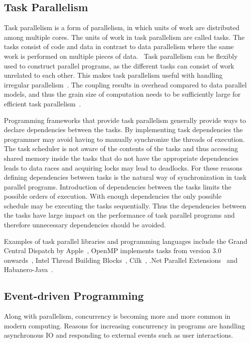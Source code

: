 \subsection{Task Parallelism}
\label{subsec:task-parallelism}
Task parallelism is a form of parallelism, in which units of work are distributed among multiple cores. The units of work in task parallelism are called tasks. The tasks consist of code and data in contrast to data parallelism where the same work is performed on multiple pieces of data.~\cite{hennessy2011computer} Task parallelism can be flexibly used to construct parallel programs, as the different tasks can consist of work unrelated to each other. This makes task parallelism useful with handling irregular parallelism~\cite{ayguade2009design}. The coupling results in overhead compared to data parallel models, and thus the grain size of computation needs to be sufficiently large for efficient task parallelism~\cite{subhlok1993exploiting}.

Programming frameworks that provide task parallelism generally provide ways to declare dependencies between the tasks. By implementing task dependencies the programmer may avoid having to manually synchronize the threads of execution. The task scheduler is not aware of the contents of the tasks and thus accessing shared memory inside the tasks that do not have the appropriate dependencies leads to data races and acquiring locks may lead to deadlocks. For these reasons defining dependencies between tasks is the natural way of synchronization in task parallel programs. Introduction of dependencies between the tasks limits the possible orders of execution. With enough dependencies the only possible schedule may be executing the tasks sequentially. Thus the dependencies between the tasks have large impact on the performance of task parallel programs and therefore unnecessary dependencies should be avoided.~\cite{hennessy2011computer}

Examples of task parallel libraries and programming languages include the Grand Central Dispatch by Apple~\cite{sakamoto2012grand}, OpenMP implements tasks from version 3.0 onwards~\cite{ayguade2009design}, Intel Thread Building Blocks~\cite{pheatt2008intel}, Cilk~\cite{blumofe1996cilk}, .Net Parallel Extensions~\cite{leijen2009design} and Habanero-Java~\cite{barik2009habanero}.

\subsection{Event-driven Programming}
\label{subsec:event-driven-programming}
Along with parallelism, concurrency is becoming more and more common in modern computing. Reasons for increasing concurrency in programs are handling asynchronous IO and responding to external events such as user interactions.

